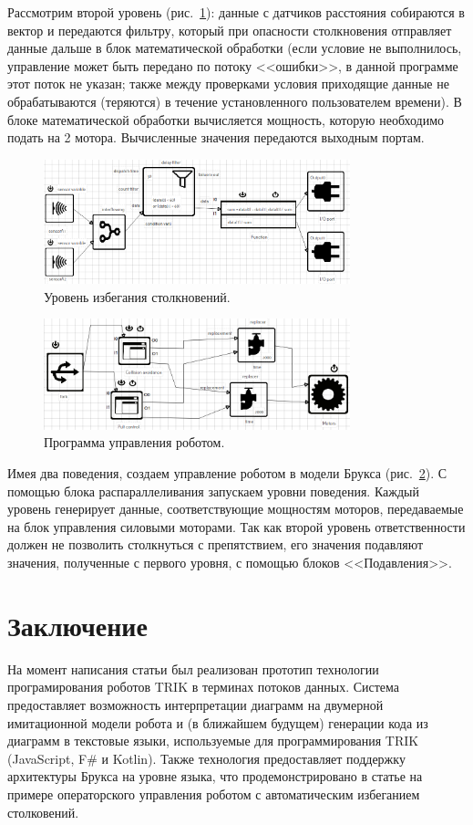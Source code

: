 \documentclass[conference]{IEEEtran}
\begin{document}
Рассмотрим второй уровень (рис.~\ref{image:layer2}): данные с датчиков расстояния собираются в вектор и передаются фильтру, который при опасности столкновения отправляет данные дальше в блок математической обработки (если условие не выполнилось, управление может быть передано по потоку <<ошибки>>, в данной программе этот поток не указан; также между проверками условия приходящие данные не обрабатываются (теряются) в течение установленного пользователем времени). В блоке математической обработки вычисляется мощность, которую необходимо подать на 2 мотора. Вычисленные значения передаются выходным портам.
\begin{figure}[ht]
	\centering
	\includegraphics[width=3.5in]{collisionLayer.png}
	\caption{Уровень избегания столкновений.}
	\label{image:layer2}
\end{figure}

\begin{figure}[ht]
	\centering
	\includegraphics[width=3.5in]{programScreen.png}
	\caption{Программа управления роботом.}
	\label{image:prog}
\end{figure}

Имея два поведения, создаем управление роботом в модели Брукса (рис.~\ref{image:prog}). С помощью блока распараллеливания запускаем уровни поведения. Каждый уровень генерирует данные, соответствующие мощностям моторов, передаваемые на блок управления силовыми моторами. Так как второй уровень ответственности должен не позволить столкнуться с препятствием, его значения подавляют значения, полученные с первого уровня, с помощью блоков <<Подавления>>.


\section{Заключение}
На момент написания статьи был реализован прототип технологии програмирования роботов TRIK в терминах потоков данных. Система предоставляет возможность интерпретации диаграмм на двумерной имитационной модели робота и (в ближайшем будущем) генерации кода из диаграмм в текстовые языки, используемые для программирования TRIK (JavaScript, F\# и Kotlin). Также технология предоставляет поддержку архитектуры Брукса на уровне языка, что продемонстрировано в статье на примере операторского управления роботом с автоматическим избеганием столковений.
\end{document}
